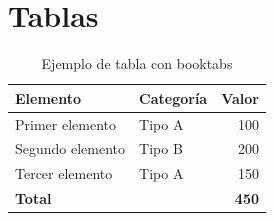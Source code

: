 


\section{Tablas}
\label{sec:tablas}

%
%

\begin{table}[htbp]
\centering
\begin{tabular}{@{}llr@{}}
\toprule
\textbf{Elemento} & \textbf{Categoría} & \textbf{Valor} \\ \midrule
Primer elemento    & Tipo A             & 100             \\
Segundo elemento   & Tipo B             & 200             \\
Tercer elemento    & Tipo A             & 150             \\ \midrule
\textbf{Total}     &                    & \textbf{450}    \\ \bottomrule
\end{tabular}
\caption{Ejemplo de tabla con booktabs}
\label{tab:ejemplo}
\end{table}



